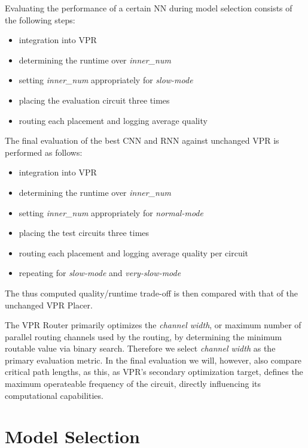 Evaluating the performance of a certain \gls{NN} during model selection consists of the following steps:

\begin{itemize}
	\item integration into \gls{VPR}
	\item determining the runtime over \textit{inner\_num}
	\item setting \textit{inner\_num} appropriately for \textit{slow-mode}
	\item placing the evaluation circuit three times
	\item routing each placement and logging average quality 
\end{itemize}

The final evaluation of the best \gls{CNN} and \gls{RNN} against unchanged \gls{VPR} is performed as follows:

\begin{itemize}
	\item integration into \gls{VPR}
	\item determining the runtime over \textit{inner\_num}
	\item setting \textit{inner\_num} appropriately for \textit{normal-mode}
	\item placing the test circuits three times
	\item routing each placement and logging average quality per circuit
	\item repeating for \textit{slow-mode} and \textit{very-slow-mode}
\end{itemize}

The thus computed quality/runtime trade-off is then compared with that of the unchanged \gls{VPR} Placer.

The \gls{VPR} Router primarily optimizes the \textit{channel width}, or maximum number of parallel routing channels used by the routing, by determining the minimum routable value via binary search. Therefore we select \textit{channel width} as the primary evaluation metric. In the final evaluation we will, however, also compare critical path lengths, as this, as \gls{VPR}'s secondary optimization target, defines the maximum operateable frequency of the circuit, directly influencing its computational capabilities.

\section{Model Selection}\label{ch:model-selection}

